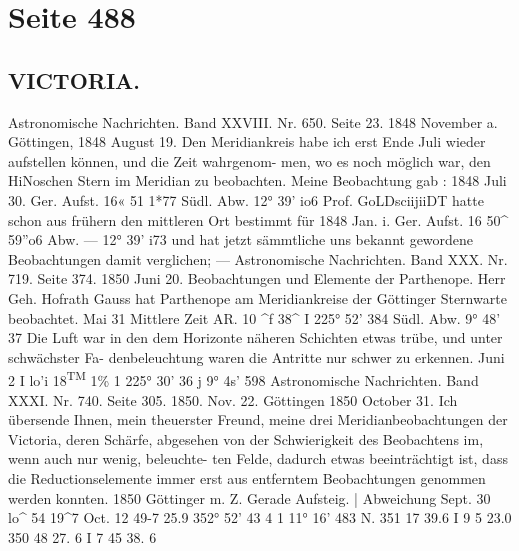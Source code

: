 \documentclass[10pt,a4paper]{article}
\begin{document}
\newpage
\section*{Seite 488}

\subsection*{VICTORIA.}

Astronomische  Nachrichten.     Band  XXVIII.  Nr.  650.  Seite  23.     1848  November  a.
Göttingen,  1848  August  19.
Den  Meridiankreis  habe  ich  erst  Ende  Juli  wieder  aufstellen  können,    und   die  Zeit  wahrgenom-
men, wo  es  noch  möglich  war,  den  HiNoschen  Stern  im  Meridian  zu  beobachten.    Meine  Beobachtung  gab :
1848  Juli  30.     Ger.  Aufst.  16«  51\glqq{}  1*77         Südl.  Abw.  12°  39'  io\glqq{}6
Prof.  GoLDsciijiiDT  hatte  schon  aus  frühern  den  mittleren  Ort  bestimmt
für  1848  Jan.  i.     Ger.  Aufst.  16\glqq{}  50\glqq{}\textasciicircum{}  59''o6         Abw.  ---  12°  39'  i7\glqq{}3
und  hat  jetzt  sämmtliche  uns  bekannt  gewordene  Beobachtungen  damit  verglichen;  ---
Astronomische  Nachrichten.     Band  XXX.  Nr.  719.  Seite  374.     1850  Juni  20.
Beobachtungen  und  Elemente  der  Parthenope.
Herr  Geh.  Hofrath  Gauss  hat  Parthenope  am  Meridiankreise  der  Göttinger  Sternwarte  beobachtet.
Mai  31
Mittlere  Zeit
AR.
10\glqq{}  \textasciicircum{}f  38\textasciicircum{}     I     225°  52'  38\glqq{}4
Südl.  Abw.
9°  48'  3\glqq{}7
Die  Luft  war  in  den  dem  Horizonte  näheren  Schichten  etwas  trübe,   und  unter   schwächster   Fa-
denbeleuchtung waren  die  Antritte  nur  schwer  zu  erkennen.
Juni  2     I     lo'i  18\textsuperscript{TM}  1\%     1     225°  30'  3\glqq{}6     j     9°  4s'  59\glqq{}8
Astronomische  Nachrichten.     Band  XXXI.  Nr.  740.  Seite  305.     1850.  Nov.  22.
Göttingen  1850  October  31.
Ich  übersende  Ihnen,  mein  theuerster  Freund,  meine  drei  Meridianbeobachtungen  der  Victoria,
deren  Schärfe,  abgesehen  von  der  Schwierigkeit  des  Beobachtens  im,  wenn  auch  nur  wenig,  beleuchte-
ten Felde,  dadurch  etwas  beeinträchtigt  ist,  dass  die  Reductionselemente  immer  erst  aus  entferntem
Beobachtungen  genommen  werden  konnten.
1850         Göttinger  m.  Z.    Gerade  Aufsteig.  |     Abweichung
Sept.  30
lo\glqq{}\textasciicircum{}
54\glqq{}
19\textasciicircum{}7
Oct.    12
49-7
25.9
352°  52'    43 \glqq{}4     1     11°   16'    48\glqq{}3  N.
351     17     39.6     I       9       5     23.0
350     48     27. 6     I       7     45     38.  6
\end{document}
